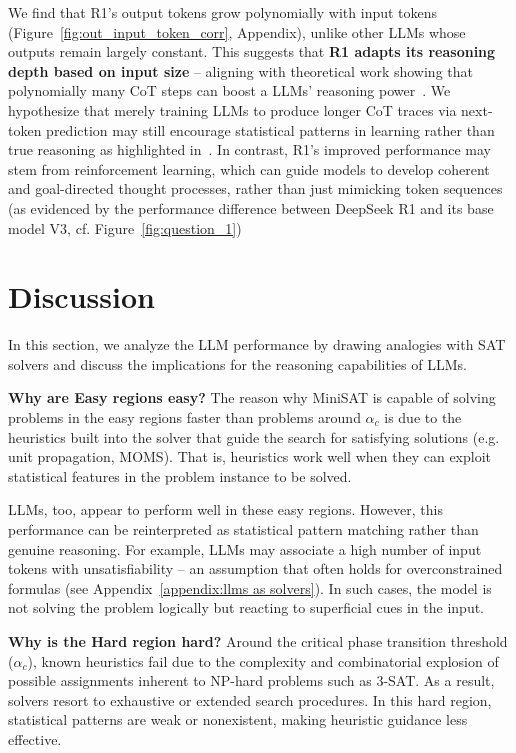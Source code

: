 \documentclass{article} %
\begin{document}

We find that R1’s output tokens grow polynomially with input tokens (Figure~\ref{fig:out_input_token_corr}, Appendix), unlike other LLMs whose outputs remain largely constant. This suggests that \textbf{R1 adapts its reasoning depth based on input size} -- aligning with theoretical work showing that polynomially many CoT steps can boost a LLMs' reasoning power~\citep{cot_complexity}. We hypothesize that merely training LLMs to produce longer CoT traces via next-token prediction may still encourage statistical patterns in learning rather than true reasoning as highlighted in~\citet{pitfalls_of_next_token_prediction}. In contrast, R1’s improved performance may stem from reinforcement learning, which can guide models to develop coherent and goal-directed thought processes, rather than just mimicking token sequences (as evidenced by the performance difference between DeepSeek R1 and its base model V3, cf. Figure~\ref{fig:question_1}) 


\section{Discussion}
\label{section: discussion}

In this section, we analyze the LLM performance by drawing analogies with SAT solvers and discuss the implications for the reasoning capabilities of LLMs.

\textbf{Why are Easy regions easy?}
The reason why MiniSAT is capable of solving problems in the easy regions faster than problems around $\alpha_c$ is due to the heuristics built into the solver that guide the search for satisfying solutions (e.g. unit propagation, MOMS). That is, heuristics work well when they can exploit statistical features in the problem instance to be solved. 

LLMs, too, appear to perform well in these easy regions. However, this performance can be reinterpreted as statistical pattern matching rather than genuine reasoning. For example, LLMs may associate a high number of input tokens with unsatisfiability -- an assumption that often holds for overconstrained formulas (see Appendix~\ref{appendix:llms as solvers}). In such cases, the model is not solving the problem logically but reacting to superficial cues in the input.

\textbf{Why is the Hard region hard?}
Around the critical phase transition threshold ($\alpha_c$), known heuristics fail due to the complexity and combinatorial explosion of possible assignments inherent to NP-hard problems such as 3-SAT. As a result, solvers resort to exhaustive or extended search procedures. In this hard region, statistical patterns are weak or nonexistent, making heuristic guidance less effective.
\end{document}
